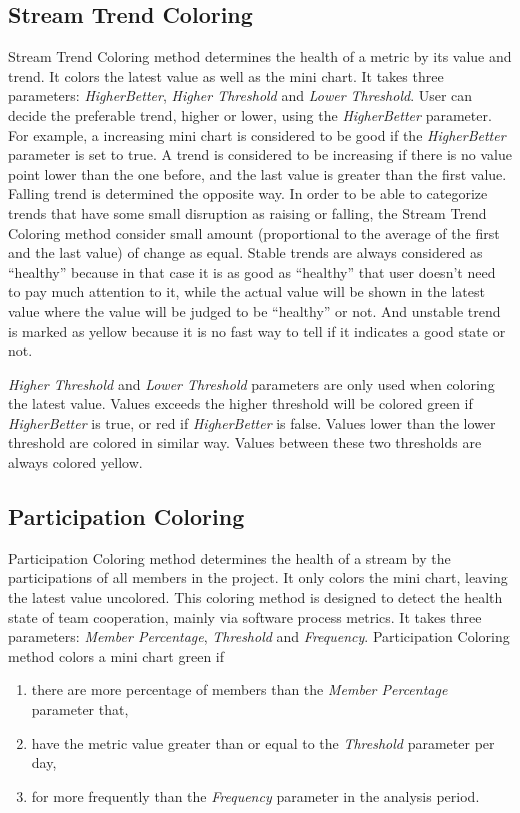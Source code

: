 \subsection{Stream Trend Coloring} 
Stream Trend Coloring method determines the health of a metric by its value and trend. It colors the latest value as well as the mini chart. It takes three parameters: {\it HigherBetter}, {\it Higher Threshold} and {\it Lower Threshold}. User can decide the preferable trend, higher or lower, using the {\it HigherBetter} parameter. For example, a increasing mini chart is considered to be good if the {\it HigherBetter} parameter is set to true. A trend is considered to be increasing if there is no value point lower than the one before, and the last value is greater than the first value. Falling trend is determined the opposite way. In order to be able to categorize trends that have some small disruption as raising or falling, the Stream Trend Coloring method consider small amount (proportional to the average of the first and the last value) of change as equal. Stable trends are always considered as ``healthy'' because in that case it is as good as ``healthy'' that user doesn't need to pay much attention to it, while the actual value will be shown in the latest value where the value will be judged to be ``healthy'' or not. And unstable trend is marked as yellow because it is no fast way to tell if it indicates a good state or not. 

{\it Higher Threshold} and {\it Lower Threshold} parameters are only used when coloring the latest value. Values exceeds the higher threshold will be colored green if {\it HigherBetter} is true, or red if {\it HigherBetter} is false. Values lower than the lower threshold are colored in similar way. Values between these two thresholds are always colored yellow.

\subsection{Participation Coloring}
Participation Coloring method determines the health of a stream by the participations of all members in the project. It only colors the mini chart, leaving the latest value uncolored. This coloring method is designed to detect the health state of team cooperation, mainly via software process metrics. It takes three parameters: {\it Member Percentage}, {\it Threshold} and {\it Frequency}. Participation Coloring method colors a mini chart green if 
\begin{enumerate}
\item there are more percentage of members than the {\it Member Percentage} parameter that,
\item have the metric value greater than or equal to the {\it Threshold} parameter per day,
\item for more frequently than the {\it Frequency} parameter in the analysis period.
\end{enumerate}

